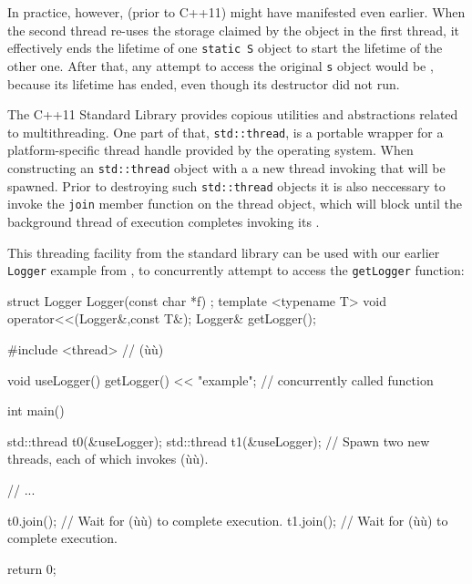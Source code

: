 In practice, however,  (prior to C++11) might
have manifested even earlier. When the second thread re-uses the storage
claimed by the object in the first thread, it effectively ends the
lifetime of one \lstinline!static!~\lstinline!S! object to start the lifetime
of the other one. After that, any attempt to access the original
\lstinline!s! object would be , because its
lifetime has ended, even though its destructor did not run. 

The C++11 Standard Library provides copious utilities and abstractions related
to multithreading. One part of that, \lstinline!std::thread!, is a portable
wrapper for a platform-specific thread handle provided by the
operating system. When constructing an \lstinline!std::thread! object
with a  a new thread
invoking that  will be spawned.   Prior to destroying such
\lstinline!std::thread! objects it is also neccessary to invoke the
\lstinline!join! member function on the thread object, which will block until
the background thread of execution completes invoking its .

This threading facility from the standard library can be used
with our earlier \lstinline!Logger! example from ,
to concurrently attempt to access the \lstinline!getLogger! function:

\begin{emcppshiddenlisting}[emcppsbatch={e6,e15}]
struct Logger {
  Logger(const char *f) {}
};
template <typename T>
void operator<<(Logger&,const T&);
Logger& getLogger();
\end{emcppshiddenlisting}
\begin{emcppslisting}[emcppsbatch=e6]
#include <thread>  // (ù{}ù)

void useLogger() { getLogger() << "example"; }  // concurrently called function

int main()
{
    std::thread t0(&useLogger);
    std::thread t1(&useLogger);
        // Spawn two new threads, each of which invokes (ù{}ù).

    // ...

    t0.join();  // Wait for (ù{}ù) to complete execution.
    t1.join();  // Wait for (ù{}ù) to complete execution.

    return 0;
}
\end{emcppslisting}

